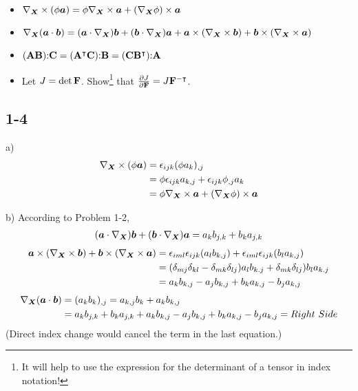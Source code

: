 \begin{itemize}
    \item $\nabla_{\bm{X}} \times (\phi \bm{a}) = \phi \nabla_{\bm{X}} \times \bm{a} + (\nabla_{\bm{X}}\phi) \times \bm{a}$
    \item $\nabla_{\bm{X}} (\bm{a} \cdot \bm{b}) = (\bm{a} \cdot \nabla_{\bm{X}}) \bm{b} + (\bm{b} \cdot \nabla_{\bm{X}}) \bm{a} + \bm{a} \times (\nabla_{\bm{X}} \times \bm{b}) + \bm{b} \times (\nabla_{\bm{X}} \times \bm{a})$
    \item $ (\mathbf{A} \mathbf{B}) \mathbf{:} \mathbf{C} = (\mathbf{A}^\intercal \mathbf{C})\mathbf{:} \mathbf{B} = (\mathbf{C} \mathbf{B}^\intercal)\mathbf{:} \mathbf{A}$
    \item Let $J = \det \mathbf{F}$. Show\footnote{It will help to use the expression for the determinant of a tensor in index notation!} that $\frac{\partial J}{\partial \mathbf{F}} = J \mathbf{F}^{-\intercal}$. 
    \end{itemize}
\subsection*{1-4}
a)
\begin{align*}
    \nabla_{\bm{X}} \times (\phi \bm{a}) &= \epsilon_{ijk}(\phi a_k)_{,j} \\
    &= \phi \epsilon_{ijk} a_{k,j} + \epsilon_{ijk} \phi_{,j}a_k \\
    &= \phi \nabla_{\bm{X}} \times \bm{a} + (\nabla_{\bm{X}}\phi) \times \bm{a}
\end{align*}

b)
According to Problem 1-2, 
\begin{align*}
    (\bm{a} \cdot \nabla_{\bm{X}}) \bm{b} + (\bm{b} \cdot \nabla_{\bm{X}}) \bm{a}=a_k b_{j,k} +b_k a_{j,k}
\end{align*}    
\begin{align*}
    \bm{a} \times (\nabla_{\bm{X}} \times \bm{b}) + \bm{b} \times (\nabla_{\bm{X}} \times \bm{a}) &= \epsilon_{iml}\epsilon_{ijk}(a_l b_{k,j}) + \epsilon_{iml}\epsilon_{ijk}(b_l a_{k,j}) \\
    &= (\delta_{mj}\delta_{kl}-\delta_{mk}\delta_{lj})a_l b_{k.j} +  \delta_{mk}\delta_{lj})b_l a_{k.j}  \\
    &= a_kb_{k,j} - a_j b_{k,j} + b_k a_{k,j} - b_j a_{k,j}
\end{align*}
\begin{align*}
    \nabla_{\bm{X}} (\bm{a} \cdot \bm{b})  &= (a_k b_k)_{,j}=a_{k,j}b_k + a_k b_{k,j} \\
    &= a_k b_{j,k} +b_k a_{j,k}+a_kb_{k,j} - a_j b_{k,j} + b_k a_{k,j} - b_j a_{k,j} = Right \ Side
\end{align*}
(Direct index change would cancel the term in the last equation.)\\

